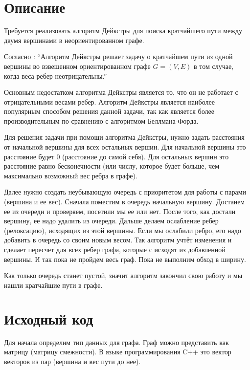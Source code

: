 \section{Описание}

Требуется реализовать алгоритм Дейкстры для поиска кратчайшего пути между двумя вершинами в неориентированном графе.

Согласно \cite{Kormen}: \enquote{Алгоритм Дейкстры решает задачу о кратчайшем пути из одной вершины во
взвешенном ориентированном графе $G = (V, E)$ в том случае, когда веса ребер
неотрицательны.}

Основным недостатком алгоритма Дейкстры является то, что он не работает с отрицательными весами ребер.
Алгоритм Дейкстры является наиболее популярным способом решения данной задачи, так как является более
производительным по сравнению с алгоритмом Беллмана-Форда.

Для решения задачи при помощи алгоритма Дейкстры, нужно задать расстояния от начальной вершины для всех остальных
вершин. Для начальной вершины это расстояние будет $0$ (расстояние до самой себя). Для остальных 
вершин это расстояние равно бесконечности (или числу, которое будет больше, чем максимально возможный вес ребра 
в графе). 

Далее нужно создать неубывающую очередь с приоритетом для работы с парами (вершина и ее вес). Сначала поместим 
в очередь начальную вершину. Достанем ее из очереди и проверяем, посетили мы ее или нет. После того, как достали
вершину, ее надо удалить из очереди. Дальше делаем ослабление ребер (релоксацию), исходящих из этой 
вершины. Если мы ослабили ребро, его надо добавить в очередь со своим новым весом. Так алгоритм учтёт изменения
 и сделает пересчет для всех ребер графа, которые с исходят из добавленной вершины. И так пока не пройдем весь граф.
Пока не выполним обход в ширину.

Как только очередь станет пустой, значит алгоритм закончил свою работу и мы нашли кратчайшие пути в графе.

\pagebreak

\section{Исходный код}

Для начала определим тип данных для графа. Граф можно представить как матрицу (матрицу смежности). 
В языке программирования C++ это вектор векторов из пар (вершина и вес пути до нее).

